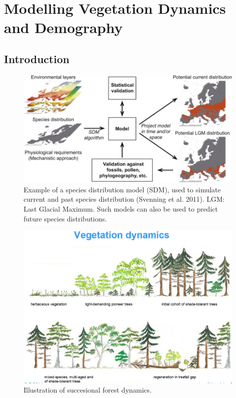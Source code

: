 \documentclass[
  12pt,
  oneside]{book}
\begin{document}
\hypertarget{modelling-vegetation-dynamics-and-demography}{%
\chapter{Modelling Vegetation Dynamics and Demography}\label{modelling-vegetation-dynamics-and-demography}}


\hypertarget{introduction-2}{%
\section{Introduction}\label{introduction-2}}

\begin{figure}

{\centering \includegraphics[width=0.8\linewidth]{figures/chap6/f61_svenning_SDM} 

}

\caption{Example of a species distribution model (SDM), used to simulate current and past species distribution (Svenning et al. 2011). LGM: Last Glacial Maximum. Such models can also be used to predict future species distributions.}\label{fig:f61}
\end{figure}

\begin{figure}

{\centering \includegraphics[width=0.8\linewidth]{figures/chap6/f62_demography} 

}

\caption{Illustration of succesional forest dynamics.}\label{fig:f62}
\end{figure}
\end{document}
